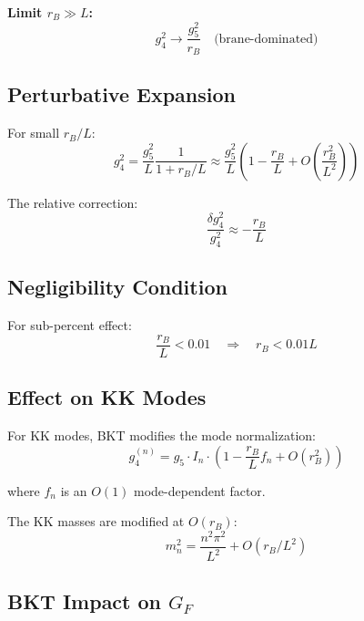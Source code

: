 \documentclass[11pt,a4paper]{article}
\begin{document}
\textbf{Limit $r_B \gg L$:}
\begin{equation}
\label{eq:bkt-limit-large}
g_4^2 \to \frac{g_5^2}{r_B} \quad \text{(brane-dominated)}
\end{equation}

\subsection{Perturbative Expansion}
\label{subsec:bkt-perturb}

For small $r_B/L$:
\begin{equation}
\label{eq:bkt-expansion}
g_4^2 = \frac{g_5^2}{L} \frac{1}{1 + r_B/L}
\approx \frac{g_5^2}{L} \left(1 - \frac{r_B}{L} + O\left(\frac{r_B^2}{L^2}\right)\right)
\end{equation}

The relative correction:
\begin{equation}
\label{eq:bkt-correction}
\frac{\delta g_4^2}{g_4^2} \approx -\frac{r_B}{L}
\end{equation}

\subsection{Negligibility Condition}
\label{subsec:bkt-negligible}

For sub-percent effect:
\begin{equation}
\label{eq:bkt-condition}
\boxed{\frac{r_B}{L} < 0.01 \quad \Rightarrow \quad r_B < 0.01 L}
\end{equation}

\subsection{Effect on KK Modes}
\label{subsec:bkt-kk}

For KK modes, BKT modifies the mode normalization:
\begin{equation}
\label{eq:bkt-kk-coupling}
g_4^{(n)} = g_5 \cdot I_n \cdot \left(1 - \frac{r_B}{L} f_n + O(r_B^2)\right)
\end{equation}

where $f_n$ is an $O(1)$ mode-dependent factor.

The KK masses are modified at $O(r_B)$:
\begin{equation}
\label{eq:bkt-kk-mass}
m_n^2 = \frac{n^2 \pi^2}{L^2} + O(r_B/L^2)
\end{equation}

\subsection{BKT Impact on $G_F$}
\label{subsec:bkt-gf}
\end{document}
